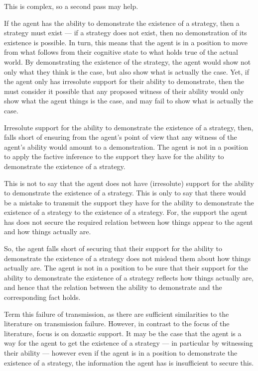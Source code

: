 \documentclass[10pt]{article}
\begin{document}
\begin{note}
  This is complex, so a second pass may help.

  If the agent has the ability to demonstrate the existence of a strategy, then a strategy must exist --- if a strategy does not exist, then no demonstration of its existence is possible.
  In turn, this means that the agent is in a position to move from what follows from their cognitive state to what holds true of the actual world.
  By demonstrating the existence of the strategy, the agent would show not only what they think is the case, but also show what is actually the case.
  Yet, if the agent only has irresolute support for their ability to demonstrate, then the must consider it possible that any proposed witness of their ability would only show what the agent things is the case, and may fail to show what is actually the case.

  Irresolute support for the ability to demonstrate the existence of a strategy, then, falls short of ensuring from the agent's point of view that any witness of the agent's ability would amount to a demonstration.
  The agent is not in a position to apply the factive inference to the support they have for the ability to demonstrate the existence of a strategy.
\end{note}

\begin{note}
  This is not to say that the agent does not have (irresolute) support for the ability to demonstrate the existence of a strategy.
  This is only to say that there would be a mistake to transmit the support they have for the ability to demonstrate the existence of a strategy to the existence of a strategy.
  For, the support the agent has does not secure the required relation between how things appear to the agent and how things actually are.

  So, the agent falls short of securing that their support for the ability to demonstrate the existence of a strategy does not mislead them about how things actually are.
  The agent is not in a position to be sure that their support for the ability to demonstrate the existence of a strategy reflects how things actually are, and hence that the relation between the ability to demonstrate and the corresponding fact holds.
\end{note}

\begin{note}
  Term this failure of transmission, as there are sufficient similarities to the literature on transmission failure.
  However, in contrast to the focus of the literature, focus is on doxastic support.
  It may be the case that the agent is a way for the agent to get the existence of a strategy --- in particular by witnessing their ability --- however even if the agent is in a position to demonstrate the existence of a strategy, the information the agent has is insufficient to secure this.
\end{note}
\end{document}
